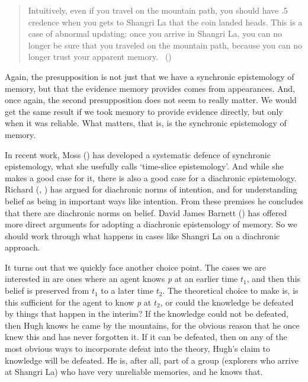 \documentclass[
  10pt,
  letterpaper,
  twoside]{scrbook}
\begin{document}
\begin{quote}
Intuitively, even if you travel on the mountain path, you should have .5
credence when you gets to Shangri La that the coin landed heads. This is
a case of abnormal updating: once you arrive in Shangri La, you can no
longer be sure that you traveled on the mountain path, because you can
no longer trust your apparent memory. ~()
\end{quote}

Again, the presupposition is not just that we have a synchronic
epistemology of memory, but that the evidence memory provides comes from
appearances. And, once again, the second presupposition does not seem to
really matter. We would get the same result if we took memory to provide
evidence directly, but only when it was reliable. What matters, that is,
is the synchronic epistemology of memory.

In recent work, Moss () has developed a
systematic defence of synchronic epistemology, what she usefully calls
`time-slice epistemology'. And while she makes a good case for it, there
is also a good case for a diachronic epistemology. Richard
(,
) has argued for diachronic norms of
intention, and for understanding belief as being in important ways like
intention. From these premises he concludes that there are diachronic
norms on belief. David James Barnett ()
has offered more direct arguments for adopting a diachronic epistemology
of memory. So we should work through what happens in cases like Shangri
La on a diachronic approach.

It turns out that we quickly face another choice point. The cases we are
interested in are ones where an agent knows \emph{p} at an earlier time
\(t_1\), and then this belief is preserved from \(t_1\) to a later time
\(t_2\). The theoretical choice to make is, is this sufficient for the
agent to know \emph{p} at \(t_2\), or could the knowledge be defeated by
things that happen in the interim? If the knowledge could not be
defeated, then {Hugh} knows he came by the mountains, for the obvious
reason that he once knew this and has never forgotten it. If it can be
defeated, then on any of the most obvious ways to incorporate defeat
into the theory, {Hugh}'s claim to knowledge will be defeated. He is,
after all, part of a group (explorers who arrive at Shangri La) who have
very unreliable memories, and he knows that.
\end{document}
